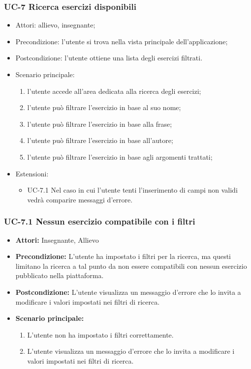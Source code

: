 \subsubsection{UC-7 Ricerca esercizi disponibili}
		\begin{itemize}
			\item Attori: allievo, insegnante;
			\item Precondizione: l'utente si trova nella vista principale dell'applicazione;
			\item Postcondizione: l'utente ottiene una lista degli esercizi filtrati.
			\item Scenario principale:
				\begin{enumerate}
					\item l'utente accede all'area dedicata alla ricerca degli esercizi;
					\item l'utente può filtrare l'esercizio in base al suo nome;
					\item l'utente può filtrare l'esercizio in base alla frase;
					\item l'utente può filtrare l'esercizio in base all'autore;
					\item l'utente può filtrare l'esercizio in base agli argomenti trattati;
				\end{enumerate}
			\item Estensioni:
				\begin{itemize}
					\item UC-7.1 Nel caso in cui l'utente tenti l'inserimento di campi non validi vedrà comparire messaggi d'errore.
				\end{itemize}
		\end{itemize}
\subsubsection{UC-7.1 Nessun esercizio compatibile con i filtri}
\begin{itemize}
		\item \textbf{Attori: } Insegnante, Allievo
		
		\item \textbf{Precondizione: }L'utente ha impostato i filtri per la ricerca, ma questi limitano la ricerca a tal punto da non essere compatibili con nessun esercizio pubblicato nella piattaforma.
		\item \textbf{Postcondizione: }L'utente visualizza un messaggio d'errore che lo invita a modificare i valori impostati nei filtri di ricerca.
		\item \textbf{Scenario principale: }
		\begin{enumerate}
		\item L'utente non ha impostato i filtri correttamente.
		 \item L'utente visualizza un messaggio d'errore che lo invita a modificare i valori impostati nei filtri di ricerca.
		\end{enumerate}
\end{itemize}
